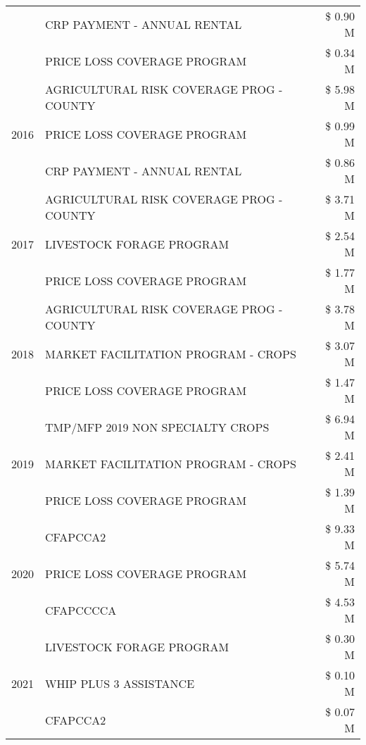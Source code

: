 \begin{tabular}{llr}
 & CRP PAYMENT - ANNUAL RENTAL & \$ 0.90 M \\
 & PRICE LOSS COVERAGE PROGRAM & \$ 0.34 M \\
\cline{1-3}
\multirow[t]{3}{*}{2016} & AGRICULTURAL RISK COVERAGE PROG - COUNTY & \$ 5.98 M \\
 & PRICE LOSS COVERAGE PROGRAM & \$ 0.99 M \\
 & CRP PAYMENT - ANNUAL RENTAL & \$ 0.86 M \\
\cline{1-3}
\multirow[t]{3}{*}{2017} & AGRICULTURAL RISK COVERAGE PROG - COUNTY & \$ 3.71 M \\
 & LIVESTOCK FORAGE PROGRAM & \$ 2.54 M \\
 & PRICE LOSS COVERAGE PROGRAM & \$ 1.77 M \\
\cline{1-3}
\multirow[t]{3}{*}{2018} & AGRICULTURAL RISK COVERAGE PROG - COUNTY & \$ 3.78 M \\
 & MARKET FACILITATION PROGRAM - CROPS & \$ 3.07 M \\
 & PRICE LOSS COVERAGE PROGRAM & \$ 1.47 M \\
\cline{1-3}
\multirow[t]{3}{*}{2019} & TMP/MFP 2019 NON SPECIALTY CROPS & \$ 6.94 M \\
 & MARKET FACILITATION PROGRAM - CROPS & \$ 2.41 M \\
 & PRICE LOSS COVERAGE PROGRAM & \$ 1.39 M \\
\cline{1-3}
\multirow[t]{3}{*}{2020} & CFAPCCA2 & \$ 9.33 M \\
 & PRICE LOSS COVERAGE PROGRAM & \$ 5.74 M \\
 & CFAPCCCCA & \$ 4.53 M \\
\cline{1-3}
\multirow[t]{3}{*}{2021} & LIVESTOCK FORAGE PROGRAM & \$ 0.30 M \\
 & WHIP PLUS 3 ASSISTANCE & \$ 0.10 M \\
 & CFAPCCA2 & \$ 0.07 M \\
\cline{1-3}
\bottomrule
\end{tabular}

